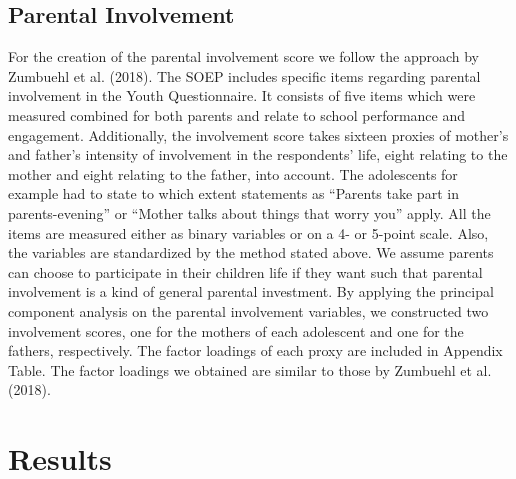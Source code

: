 \documentclass[%
    a4paper,            %
    11pt,               %
    bibliography=totoc, %
]
{scrartcl}
\begin{document}
\subsection{Parental Involvement}
For the creation of the parental involvement score we follow the approach by Zumbuehl et al. (2018).
The SOEP includes specific items regarding parental involvement in the Youth Questionnaire. It consists of five items which were measured combined for both parents and relate to school performance and engagement. Additionally, the involvement score takes sixteen proxies of mother's and father’s intensity of involvement in the respondents’ life, eight relating to the mother and eight relating to the father, into account. The adolescents for example had to state to which extent statements as “Parents take part in parents-evening” or  “Mother talks about things that worry you” apply. All the items are measured either as binary variables or on a 4- or 5-point scale. Also, the variables are standardized by the method stated above. We assume parents can choose to participate in their children life if they want such that parental involvement is a kind of general parental investment. By applying the principal component analysis on the parental involvement variables, we constructed two involvement scores, one for the mothers of each adolescent and one for the fathers, respectively. The factor loadings of each proxy are included in Appendix Table. The factor loadings we obtained are similar to those by Zumbuehl et al. (2018).



\section{Results}
\end{document}
